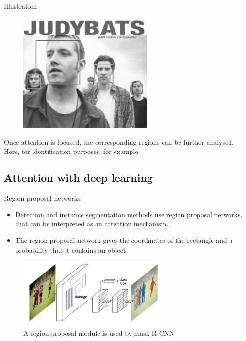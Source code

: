 \documentclass[xcolor=pdftex,dvipsnames,table,mathserif]{beamer}
\begin{document}
\begin{frame}{Illustration~\cite{viola_rapid_2001}}

\begin{figure}[ht]
  \centering
  \includegraphics[width=0.6\textwidth]{viola_jones_example}
\end{figure}

Once attention is focused, the corresponding regions can be further analysed. Here, for identification purposes, for example.

\end{frame}


\subsection{Attention with deep learning}


\begin{frame}{Region proposal networks \cite{ren_faster_2015}}

  \begin{itemize}
  \item Detection and instance segmentation methods use region proposal networks, that can be interpreted as an attention mechanism.
  \item The region proposal network gives the coordinates of the rectangle and a probability that it contains an object.
  \end{itemize}


\begin{figure}
  \centering
  \includegraphics[width=7.5cm]{mask_r_cnn.png}\\
  \scriptsize{A region proposal module is used by mask R-CNN~\cite{he_mask_2017}}
  \end{figure}

\end{frame}
\end{document}
